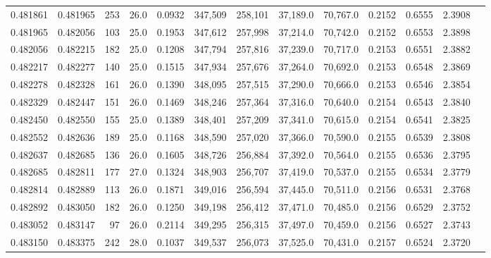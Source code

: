\begin{tabular}{rrrrrrrrrrrrr}
0.481861 & 0.481965 &   253 & 26.0 &                                     0.0932 & 347,509 & 258,101 &  37,189.0 &  70,767.0 & 0.2152 & 0.6555 & 2.3908 \\
0.481965 & 0.482056 &   103 & 25.0 &                                     0.1953 & 347,612 & 257,998 &  37,214.0 &  70,742.0 & 0.2152 & 0.6553 & 2.3898 \\
0.482056 & 0.482215 &   182 & 25.0 &                                     0.1208 & 347,794 & 257,816 &  37,239.0 &  70,717.0 & 0.2153 & 0.6551 & 2.3882 \\
0.482217 & 0.482277 &   140 & 25.0 &                                     0.1515 & 347,934 & 257,676 &  37,264.0 &  70,692.0 & 0.2153 & 0.6548 & 2.3869 \\
0.482278 & 0.482328 &   161 & 26.0 &                                     0.1390 & 348,095 & 257,515 &  37,290.0 &  70,666.0 & 0.2153 & 0.6546 & 2.3854 \\
0.482329 & 0.482447 &   151 & 26.0 &                                     0.1469 & 348,246 & 257,364 &  37,316.0 &  70,640.0 & 0.2154 & 0.6543 & 2.3840 \\
0.482450 & 0.482550 &   155 & 25.0 &                                     0.1389 & 348,401 & 257,209 &  37,341.0 &  70,615.0 & 0.2154 & 0.6541 & 2.3825 \\
0.482552 & 0.482636 &   189 & 25.0 &                                     0.1168 & 348,590 & 257,020 &  37,366.0 &  70,590.0 & 0.2155 & 0.6539 & 2.3808 \\
0.482637 & 0.482685 &   136 & 26.0 &                                     0.1605 & 348,726 & 256,884 &  37,392.0 &  70,564.0 & 0.2155 & 0.6536 & 2.3795 \\
0.482685 & 0.482811 &   177 & 27.0 &                                     0.1324 & 348,903 & 256,707 &  37,419.0 &  70,537.0 & 0.2155 & 0.6534 & 2.3779 \\
0.482814 & 0.482889 &   113 & 26.0 &                                     0.1871 & 349,016 & 256,594 &  37,445.0 &  70,511.0 & 0.2156 & 0.6531 & 2.3768 \\
0.482892 & 0.483050 &   182 & 26.0 &                                     0.1250 & 349,198 & 256,412 &  37,471.0 &  70,485.0 & 0.2156 & 0.6529 & 2.3752 \\
0.483052 & 0.483147 &    97 & 26.0 &                                     0.2114 & 349,295 & 256,315 &  37,497.0 &  70,459.0 & 0.2156 & 0.6527 & 2.3743 \\
0.483150 & 0.483375 &   242 & 28.0 &                                     0.1037 & 349,537 & 256,073 &  37,525.0 &  70,431.0 & 0.2157 & 0.6524 & 2.3720 \\

\end{tabular}
